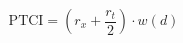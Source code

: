 \begin{equation} \label{eq:ptci}
\mathrm{PTCI} = \left( r_{x} + \frac{r_{t}}{2} \right) \cdot w(d)
\end{equation}